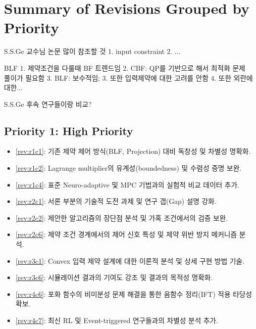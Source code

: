 \newpage
\section*{Summary of Revisions Grouped by Priority}

S.S.Ge 교수님 논문 많이 참조할 것
1. input constraint
2. ...

BLF 
1. 제약조건을 다룰때 BF 트렌드임
2. CBF: QP를 기반으로 해서 최적화 문제 풀이가 필요함
3. BLF: 보수적임; 
3. 또한 입력제약에 대한 고려를 안함
4. 또한 외란에 대한...

S.S.Ge 후속 연구들이랑 비교?



\subsection*{Priority 1: High Priority}

\begin{itemize}
    \item \cref{rev:r1c1}: 기존 제약 제어 방식(BLF, Projection) 대비 독창성 및 차별성 명확화.
    \item \cref{rev:r1c2}: Lagrange multiplier의 유계성(boundedness) 및 수렴성 증명 보완.
    \item \cref{rev:r1c4}: 표준 Neuro-adaptive 및 MPC 기법과의 실험적 비교 데이터 추가.
    \item \cref{rev:r2c1}: 서론 부분의 기술적 도전 과제 및 연구 갭(Gap) 설명 강화.
    \item \cref{rev:r2c2}: 제안한 알고리즘의 장단점 분석 및 가혹 조건에서의 검증 보완.
    \item \cref{rev:r2c6}: 제약 조건 경계에서의 제어 신호 특성 및 제약 위반 방지 메커니즘 분석.
    \item \cref{rev:r3c1}: Convex 입력 제약 설계에 대한 이론적 분석 및 상세 구현 방법 기술.
    \item \cref{rev:r3c6}: 시뮬레이션 결과의 기여도 강조 및 결과의 목적성 명확화.
    \item \cref{rev:r4c6}: 포화 함수의 비미분성 문제 해결을 통한 음함수 정리(IFT) 적용 타당성 확보.
    \item \cref{rev:r4c7}: 최신 RL 및 Event-triggered 연구들과의 차별성 분석 추가.
\end{itemize}

